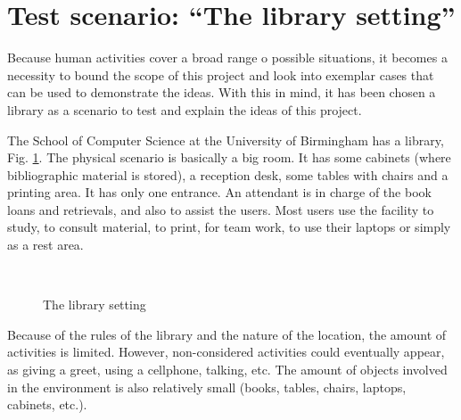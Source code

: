 

\section{Test scenario: ``The library setting''} \label{sec_Library} %

Because human activities cover a broad range o possible situations, it becomes a necessity to bound the scope of this project and look into exemplar cases that can be used to demonstrate the ideas. 
With this in mind, it has been chosen a library as a scenario to test and explain the ideas of this project.

The School of Computer Science at the University of Birmingham has a library, Fig. \ref{fig_library}.
The physical scenario is basically a big room. 
It has some cabinets (where bibliographic material is stored), a reception desk, some tables with chairs and a printing area. 
It has only one entrance.
An attendant is in charge of the book loans and retrievals, and also to assist the users.
Most users use the facility to study, to consult material, to print, for team work, to use their laptops or simply as a rest area.

\begin{figure}[tbp]
  \centering
  \quad
  \\
  \label{fig_library}\caption{The library setting}
\end{figure}

Because of the rules of the library and the nature of the location, the amount of activities is limited.
However, non-considered activities could eventually appear, as giving a greet, using a cellphone, talking, etc.
The amount of objects involved in the environment is also relatively small (books, tables, chairs, laptops, cabinets, etc.).

